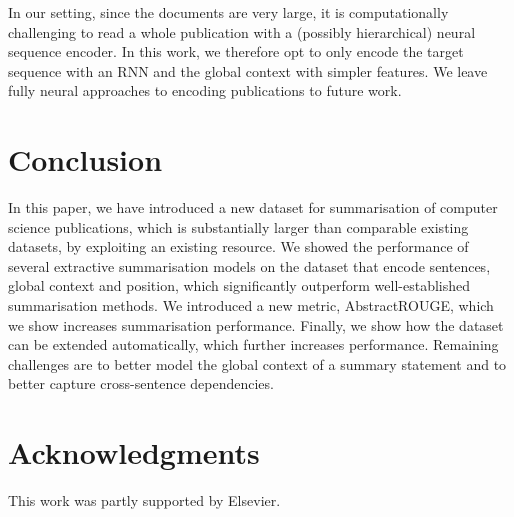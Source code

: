 \documentclass[11pt,a4paper]{article}
\begin{document}
In our setting, since the documents are very large, it is computationally challenging to read a whole publication with a (possibly hierarchical) neural sequence encoder. 
In this work, we therefore opt to only encode the target sequence with an RNN and the global context with simpler features.
We leave fully neural approaches to encoding publications to future work.


\section{Conclusion}

In this paper, we have introduced a new dataset for summarisation of computer science publications, which is substantially larger than comparable existing datasets, by exploiting an existing resource. We showed the performance of several extractive summarisation models on the dataset that encode sentences, global context and position, which significantly outperform well-established summarisation methods. We introduced a new metric, AbstractROUGE, which we show increases summarisation performance. Finally, we show how the dataset can be extended automatically, which further increases performance.
Remaining challenges are to better model the global context of a summary statement and to better capture cross-sentence dependencies.

\section*{Acknowledgments}

This work was partly supported by Elsevier.


%
%



\appendix

\end{document}
